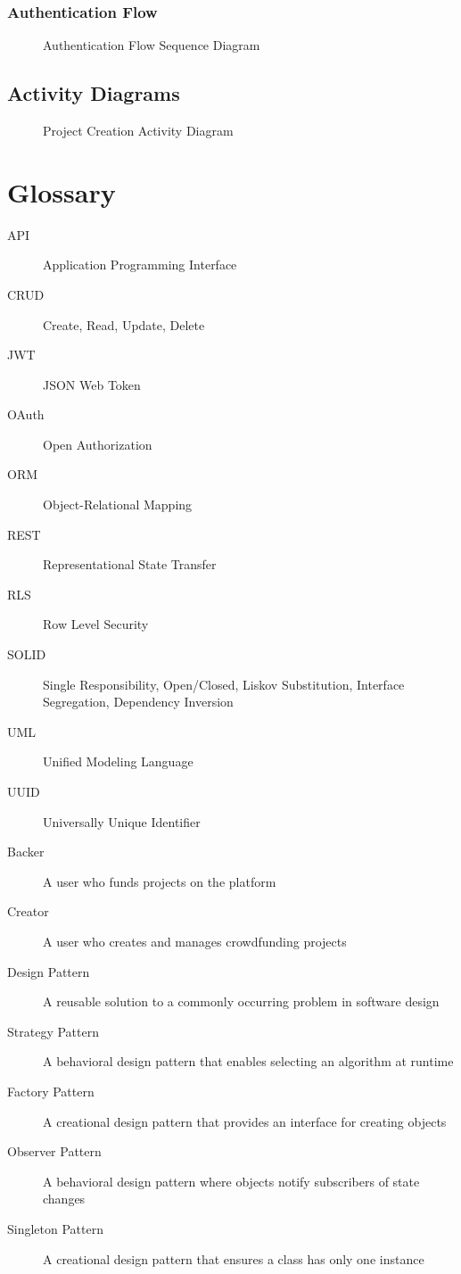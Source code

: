 \documentclass[a4paper,12pt]{report}
\begin{document}
\subsection{Authentication Flow}
\begin{figure}[h]
    \centering
    \caption{Authentication Flow Sequence Diagram}
\end{figure}

\section{Activity Diagrams}

\begin{figure}[h]
    \centering
    \caption{Project Creation Activity Diagram}
\end{figure}

\chapter{Glossary}

\begin{description}
    \item[API] Application Programming Interface
    \item[CRUD] Create, Read, Update, Delete
    \item[JWT] JSON Web Token
    \item[OAuth] Open Authorization
    \item[ORM] Object-Relational Mapping
    \item[REST] Representational State Transfer
    \item[RLS] Row Level Security
    \item[SOLID] Single Responsibility, Open/Closed, Liskov Substitution, Interface Segregation, Dependency Inversion
    \item[UML] Unified Modeling Language
    \item[UUID] Universally Unique Identifier
    \item[Backer] A user who funds projects on the platform
    \item[Creator] A user who creates and manages crowdfunding projects
    \item[Design Pattern] A reusable solution to a commonly occurring problem in software design
    \item[Strategy Pattern] A behavioral design pattern that enables selecting an algorithm at runtime
    \item[Factory Pattern] A creational design pattern that provides an interface for creating objects
    \item[Observer Pattern] A behavioral design pattern where objects notify subscribers of state changes
    \item[Singleton Pattern] A creational design pattern that ensures a class has only one instance
\end{description}
\end{document}
